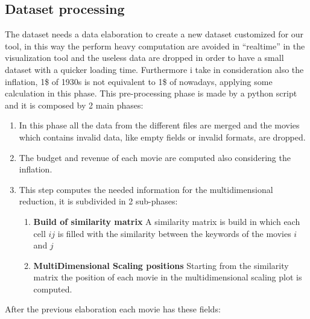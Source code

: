 \documentclass[]{article}
\newcommand{\quotes}[1]{``#1''}
\begin{document}
\subsection{Dataset processing}
The dataset needs a data elaboration to create a new dataset customized for our tool, in this way the perform heavy computation are avoided in \quotes{realtime} in the visualization tool and the useless data are dropped in order to have a small dataset with a quicker loading time.\newline
Furthermore i take in consideration also the inflation, 1\$ of 1930s is not equivalent to 1\$ of nowadays, applying some calculation in this phase.\newline
This pre-processing phase is made by a python script and it is composed by 2 main phases:
\begin{enumerate}
	\item In this phase all the data from the different files are merged and the movies which contains invalid data, like empty fields or invalid formats, are dropped.
	\item The budget and revenue of each movie are computed also considering the inflation.
	\item This step computes the needed information for the multidimensional reduction, it is subdivided in 2 sub-phases:
	\begin{enumerate}
		\item \textbf{Build of similarity matrix}\newline
		A similarity matrix is build in which each cell $ij$ is filled with the similarity between the keywords of the movies $i$ and $j$
		\item \textbf{MultiDimensional Scaling positions}\newline
		Starting from the similarity matrix the position of each movie in the multidimensional scaling plot is computed.
	\end{enumerate}
\end{enumerate}
After the previous elaboration each movie has these fields:
\end{document}

